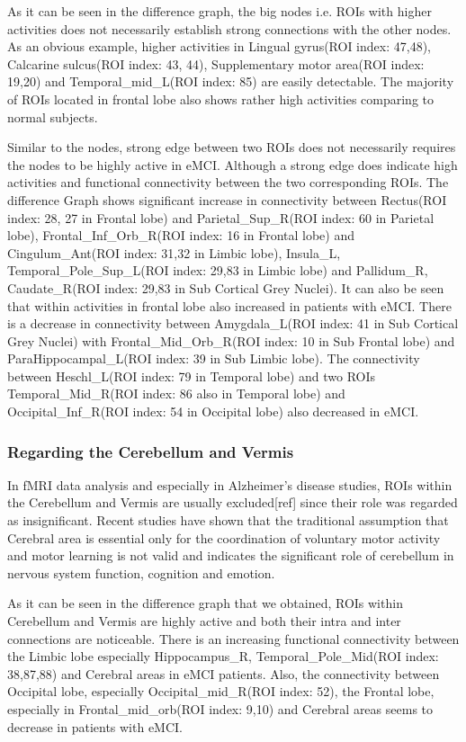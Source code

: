 \documentclass[journal]{IEEEtran}
\begin{document}
	As it can be seen in the difference graph, the big nodes i.e. ROIs with higher activities does not necessarily establish strong connections with the other nodes. As an obvious example, higher activities in Lingual gyrus(ROI index: 47,48)\cite{r24,r25}, Calcarine sulcus(ROI index: 43, 44)\cite{r26,r27}, Supplementary motor area(ROI index: 19,20)\cite{r27,r28} and Temporal\_mid\_L(ROI index: 85)\cite{r29} are easily detectable. The majority of ROIs located in frontal lobe also shows rather high activities comparing to normal subjects\cite{r31,r30}.
	
	Similar to the nodes, strong edge between two ROIs does not necessarily requires the nodes to be highly active in eMCI. Although a strong edge does indicate high activities and functional connectivity between the two corresponding ROIs. The difference Graph shows significant increase in connectivity between 
	Rectus(ROI index: 28, 27 in Frontal lobe) and 
	Parietal\_Sup\_R(ROI index: 60 in Parietal lobe),
	Frontal\_Inf\_Orb\_R(ROI index: 16 in Frontal lobe) and
	Cingulum\_Ant(ROI index: 31,32 in Limbic lobe), 
	Insula\_L, Temporal\_Pole\_Sup\_L(ROI index: 29,83 in Limbic lobe) and
	Pallidum\_R, Caudate\_R(ROI index: 29,83 in Sub Cortical Grey Nuclei). It can also be seen that within activities in frontal lobe also increased in patients with eMCI. There is a decrease in connectivity between Amygdala\_L(ROI index: 41 in Sub Cortical Grey Nuclei) with Frontal\_Mid\_Orb\_R(ROI index: 10 in Sub Frontal lobe) and ParaHippocampal\_L(ROI index: 39 in Sub Limbic lobe). The connectivity between Heschl\_L(ROI index: 79 in Temporal lobe) and two ROIs Temporal\_Mid\_R(ROI index: 86 also in Temporal lobe) and Occipital\_Inf\_R(ROI index: 54 in Occipital lobe) also decreased in eMCI.  
	
	\subsubsection*{Regarding the Cerebellum and Vermis}
	In fMRI data analysis and especially in Alzheimer's disease studies, ROIs within the Cerebellum and Vermis are usually excluded[ref] since their role was regarded as insignificant. Recent studies have shown that the traditional assumption that Cerebral area is essential only for the coordination of voluntary motor activity and motor learning is not valid and indicates the significant role of cerebellum in nervous system function, cognition and emotion\cite{r32}. 
	
	As it can be seen in the difference graph that we obtained, ROIs within Cerebellum and Vermis are highly active and both their intra and inter connections are noticeable. There is an increasing functional connectivity between the Limbic lobe especially 
	Hippocampus\_R, Temporal\_Pole\_Mid(ROI index: 38,87,88)
	and Cerebral areas in eMCI patients. Also, the connectivity between Occipital lobe, especially Occipital\_mid\_R(ROI index: 52), the Frontal lobe, especially in Frontal\_mid\_orb(ROI index: 9,10) and Cerebral areas seems to decrease in patients with eMCI.
	
\end{document}
